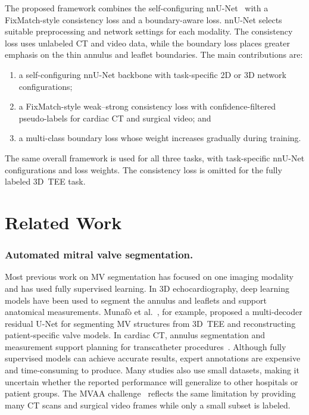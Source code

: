 \documentclass[runningheads]{llncs}
\begin{document}
The proposed framework combines the self-configuring
nnU-Net~\cite{ref_nnunet} with a FixMatch-style consistency loss and a
boundary-aware loss. nnU-Net selects suitable preprocessing and network
settings for each modality. The consistency loss uses unlabeled CT and
video data, while the boundary loss places greater emphasis on the thin
annulus and leaflet boundaries. The main contributions are:

\begin{enumerate}
\item a self-configuring nnU-Net backbone with task-specific 2D or 3D
network configurations;
\item a FixMatch-style weak--strong consistency loss with
confidence-filtered pseudo-labels for cardiac CT and surgical video;
and
\item a multi-class boundary loss whose weight increases gradually
during training.
\end{enumerate}

The same overall framework is used for all three tasks, with
task-specific nnU-Net configurations and loss weights. The consistency
loss is omitted for the fully labeled 3D~TEE task.

\section{Related Work}
\label{sec:related}

\subsubsection{Automated mitral valve segmentation.}

Most previous work on MV segmentation has focused on one imaging
modality and has used fully supervised learning. In 3D
echocardiography, deep learning models have been used to segment the
annulus and leaflets and support anatomical measurements. Munaf\`o et
al.~\cite{ref_munafo}, for example, proposed a multi-decoder residual
U-Net for segmenting MV structures from 3D~TEE and reconstructing
patient-specific valve models. In cardiac CT, annulus segmentation and
measurement support planning for transcatheter
procedures~\cite{ref_ct}. Although fully supervised models can achieve
accurate results, expert annotations are expensive and time-consuming
to produce. Many studies also use small datasets, making it uncertain
whether the reported performance will generalize to other hospitals or
patient groups. The MVAA challenge~\cite{ref_mvaa} reflects the same
limitation by providing many CT scans and surgical video frames while
only a small subset is labeled.
\end{document}
